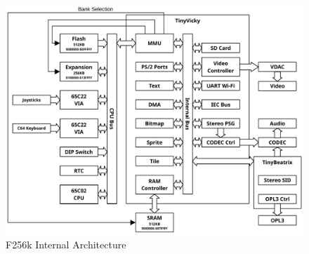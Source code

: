 \begin{figure}[ht]
    \begin{center}
        \includegraphics[scale=0.55]{images/f256k_layout.pdf}
    \end{center}
    \caption{F256k Internal Architecture}
    \label{fig:f256k_arch}
\end{figure}
